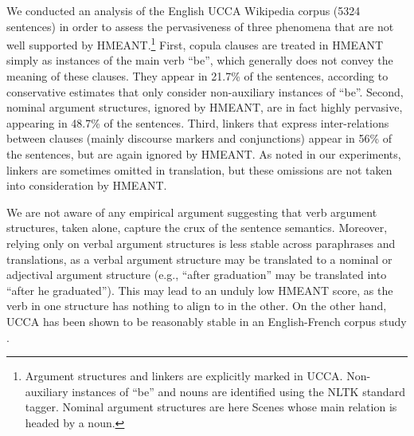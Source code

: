 \documentclass[11pt,letterpaper]{article}
\newcommand{\com}[1]{}
\def\equo#1{``{#1}''}  %
\begin{document}


\com{
}

We conducted an analysis of the English UCCA Wikipedia corpus (5324 sentences) in order to assess the pervasiveness of three phenomena that are not well supported by HMEANT.\footnote{Argument structures and linkers are explicitly marked in UCCA. Non-auxiliary instances of ``be'' and nouns are identified using the NLTK standard tagger. Nominal argument structures are here Scenes whose main relation is headed by a noun.}
First, copula clauses are treated in HMEANT simply as instances of the main verb ``be'', which generally does not convey the meaning of these clauses. They appear in 21.7\% of the sentences, according to conservative estimates that only consider non-auxiliary
instances of ``be''.
Second, nominal argument structures, ignored by HMEANT, are in fact highly
pervasive, appearing in 48.7\% of the sentences.
Third, linkers that express inter-relations between
clauses (mainly discourse markers and conjunctions) appear in 56\% of the
sentences, but are again ignored by HMEANT. As noted in our experiments, linkers
are sometimes omitted in translation, but these omissions are not taken
into consideration by HMEANT.


We are not aware of any empirical argument suggesting that verb argument structures,
taken alone, capture the crux of the sentence semantics.
Moreover, relying only on verbal argument structures is less stable across paraphrases
and translations, as a verbal argument structure
may be translated to a nominal or adjectival argument structure
(e.g., ``after graduation'' may be translated into ``after he graduated'').
This may lead to an unduly low HMEANT score, as the verb
in one structure has nothing to align to in the other.
On the other hand, UCCA has been shown to be reasonably stable in an English-French
corpus study \cite{sulem2015conceptual}.
\end{document}
